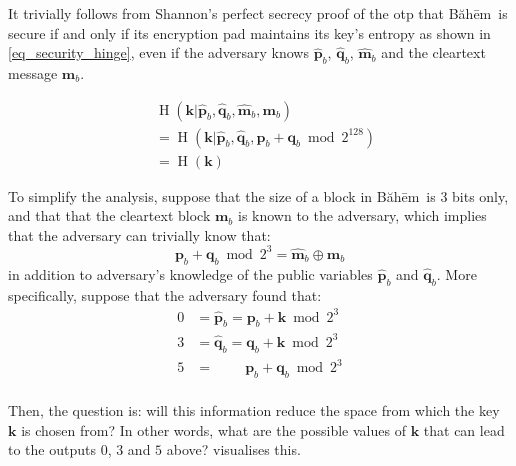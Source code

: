 \documentclass[twocolumn,hidelinks]{article}
\newcommand{\baheem}{Băhēm}
\DeclareMathOperator{\entropy}{H}
\begin{document}
It trivially follows from Shannon's perfect secrecy proof of the \gls{otp}
\cite{perfect_secrecy} that \baheem\ is secure if and only if its
encryption pad maintains its key's entropy as shown in
\cref{eq_security_hinge}, even if the adversary knows $\mathbf{\hat p}_b$,
$\mathbf{\hat q}_b$, $\mathbf{\hat m}_b$ and the cleartext message
$\mathbf{m}_b$.

\begin{equation}
    \begin{split}
        &\entropy(
            \mathbf{k}
            | \mathbf{\hat p}_b,
              \mathbf{\hat q}_b,
              \mathbf{\hat m}_b,
              \mathbf{m}_b
        ) \\
        &=\entropy(
            \mathbf{k}
            | \mathbf{\hat p}_b,
              \mathbf{\hat q}_b,
              \mathbf{p}_b + \mathbf{q}_b \bmod{2^{128}}
        ) \\
        &= \entropy(\mathbf{k})
    \end{split}
    \label{eq_security_hinge}
\end{equation}

To simplify the analysis, suppose that the size of a block in \baheem\ is
$3$ bits only, and that that the cleartext block $\mathbf{m}_b$ is known to
the adversary, which implies that the adversary can trivially know that:
\[
    \mathbf{p}_b + \mathbf{q}_b \bmod{2^3}
    = \mathbf{\hat m}_b \oplus \mathbf{m}_b
\]
in addition to adversary's knowledge of the public variables $\mathbf{\hat
p}_b$ and $\mathbf{\hat q}_b$. More specifically, suppose that the
adversary found that:
\begin{align*}
    0&=\mathbf{\hat p}_b = \mathbf{p}_b + \mathbf{k} \bmod{2^3}  \\
    3&=\mathbf{\hat q}_b = \mathbf{q}_b + \mathbf{k} \bmod{2^3}  \\
    5&=\qquad\             \mathbf{p}_b + \mathbf{q}_b \bmod{2^3}\\
\end{align*}

Then, the question is:  will this information reduce the space from which
the key $\mathbf{k}$ is chosen from?  In other words, what are the possible
values of $\mathbf{k}$ that can lead to the outputs $0$, $3$ and $5$ above?
 visualises this.
\end{document}

